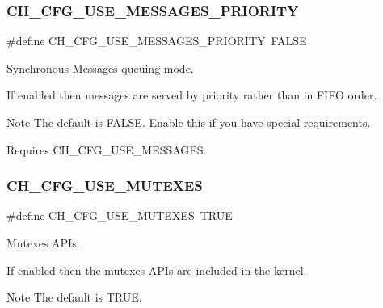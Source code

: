\subsubsection{\texorpdfstring{C\+H\+\_\+\+C\+F\+G\+\_\+\+U\+S\+E\+\_\+\+M\+E\+S\+S\+A\+G\+E\+S\+\_\+\+P\+R\+I\+O\+R\+I\+TY}{CH\_CFG\_USE\_MESSAGES\_PRIORITY}}
{\footnotesize\ttfamily \#define C\+H\+\_\+\+C\+F\+G\+\_\+\+U\+S\+E\+\_\+\+M\+E\+S\+S\+A\+G\+E\+S\+\_\+\+P\+R\+I\+O\+R\+I\+TY~F\+A\+L\+SE}



Synchronous Messages queuing mode. 

If enabled then messages are served by priority rather than in F\+I\+FO order.

\begin{DoxyNote}{Note}
The default is {\ttfamily F\+A\+L\+SE}. Enable this if you have special requirements. 

Requires {\ttfamily C\+H\+\_\+\+C\+F\+G\+\_\+\+U\+S\+E\+\_\+\+M\+E\+S\+S\+A\+G\+ES}. 
\end{DoxyNote}
\hypertarget{group__config_ga7263b362a62e34158d09b44b4c204c27}{}\label{group__config_ga7263b362a62e34158d09b44b4c204c27} 
\subsubsection{\texorpdfstring{C\+H\+\_\+\+C\+F\+G\+\_\+\+U\+S\+E\+\_\+\+M\+U\+T\+E\+X\+ES}{CH\_CFG\_USE\_MUTEXES}}
{\footnotesize\ttfamily \#define C\+H\+\_\+\+C\+F\+G\+\_\+\+U\+S\+E\+\_\+\+M\+U\+T\+E\+X\+ES~T\+R\+UE}



Mutexes A\+P\+Is. 

If enabled then the mutexes A\+P\+Is are included in the kernel.

\begin{DoxyNote}{Note}
The default is {\ttfamily T\+R\+UE}. 
\end{DoxyNote}
\hypertarget{group__config_gab9a61e9638af4b918ebad4e177dead4d}{}\label{group__config_gab9a61e9638af4b918ebad4e177dead4d} 
